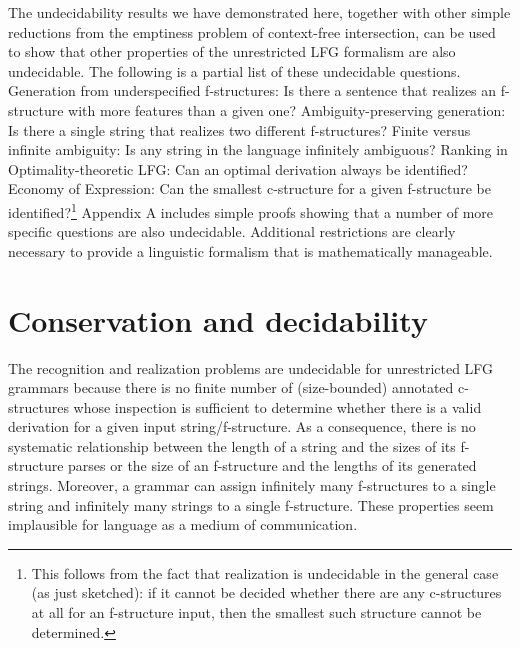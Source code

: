 \documentclass[output=paper,hidelinks]{langscibook}
\begin{document}
The undecidability results we have demonstrated here, together with other simple reductions from the emptiness problem of context-free intersection, can be used to show that other properties of the unrestricted LFG formalism are also undecidable.  The following is a partial list of these undecidable questions.
\ea\label{otherundecidableprobs}
\ea Generation from underspecified f-structures:  Is there a sentence that realizes an f-structure with more features than a given one? \citep{Wedekind99}
\ex Ambiguity-preserving generation: Is there a single string that realizes two different f-structures? \citep{wedekind-kaplan-1996-ambiguity}
\ex Finite versus infinite ambiguity: Is any string in the language infinitely ambiguous? \citep{Jaeger2005}
\ex Ranking in Optimality-theoretic LFG: Can an optimal derivation always be identified? \citep{Kuhn-CSLI-book}
\ex Economy of Expression:  Can the smallest c-structure for a given f-structure be identified?\footnote{This follows from the fact that realization is undecidable in the general case (as just sketched):  if it cannot be decided whether there are any c-structures at all for an f-structure input, then the smallest such structure cannot be determined.}
\z
\z
\noindent Appendix A includes simple proofs showing that a number of more specific questions are also undecidable.  Additional restrictions are clearly necessary to provide a linguistic formalism that is  mathematically manageable.


\section{Conservation and decidability}\label{decidable}

The recognition and realization problems are undecidable for unrestricted LFG grammars because there is no finite number of (size-bounded) annotated c-structures whose inspection is sufficient to determine whether there is a valid derivation for a given input string/f-structure.  As a consequence, there is no systematic relationship between the length of a string and the sizes of its f-structure parses or the size of an f-structure and the lengths of its generated strings.  Moreover, a grammar can assign infinitely many f-structures to a single string  and infinitely many strings to a single f-structure.  These properties seem implausible for language as a medium of communication.
\end{document}
